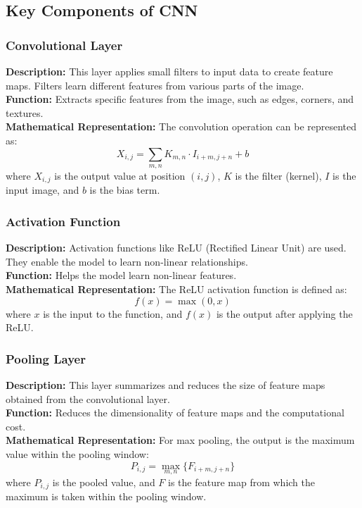 \documentclass{article}
\begin{document}
\vspace{3cm}

\subsection{Key Components of CNN}

\subsubsection{Convolutional Layer}
\textbf{Description:} This layer applies small filters to input data to create feature maps. Filters learn different features from various parts of the image. \\
\textbf{Function:} Extracts specific features from the image, such as edges, corners, and textures. \\
\textbf{Mathematical Representation:} 
The convolution operation can be represented as:
\begin{equation}
    X_{i,j} = \sum_{m,n} K_{m,n} \cdot I_{i+m,j+n} + b
\end{equation}
where \( X_{i,j} \) is the output value at position \( (i, j) \), \( K \) is the filter (kernel), \( I \) is the input image, and \( b \) is the bias term.

\subsubsection{Activation Function}
\textbf{Description:} Activation functions like ReLU (Rectified Linear Unit) are used. They enable the model to learn non-linear relationships. \\
\textbf{Function:} Helps the model learn non-linear features. \\
\textbf{Mathematical Representation:}
The ReLU activation function is defined as:
\begin{equation}
    f(x) = \max(0, x)
\end{equation}
where \( x \) is the input to the function, and \( f(x) \) is the output after applying the ReLU.

\subsubsection{Pooling Layer}
\textbf{Description:} This layer summarizes and reduces the size of feature maps obtained from the convolutional layer. \\
\textbf{Function:} Reduces the dimensionality of feature maps and the computational cost. \\
\textbf{Mathematical Representation:}
For max pooling, the output is the maximum value within the pooling window:
\begin{equation}
    P_{i,j} = \max_{m,n} \{ F_{i+m,j+n} \}
\end{equation}
where \( P_{i,j} \) is the pooled value, and \( F \) is the feature map from which the maximum is taken within the pooling window.
\end{document}
